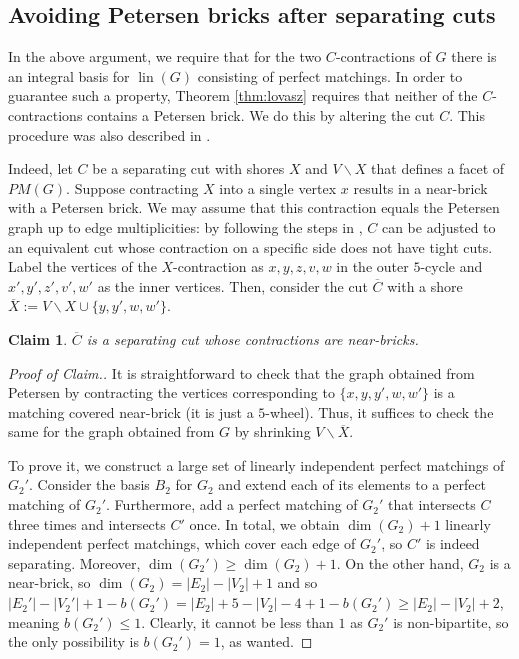 \documentclass[11pt]{article}
\DeclareMathOperator{\lin}{lin}
\newcommand{\1}{\mathbf{1}}
\newcommand{\0}{\mathbf{0}}
\newcounter{claim-nb}[theorem]
\newtheorem{claim}[claim-nb]{Claim}
\newcounter{claim-nbs}[section]
\newenvironment{cproof}
{\begin{proof}
 [Proof of Claim.]
 \vspace{-1.2\parsep}}
{\renewcommand{\qed}{\hfill $\Diamond$} \end{proof}}
\begin{document}
\subsection{Avoiding Petersen bricks after separating cuts}

In the above argument, we require that for the two $C$-contractions of $G$ there is an integral basis for $\lin(G)$ consisting of perfect matchings. In order to guarantee such a property, Theorem \ref{thm:lovasz} requires that neither of the $C$-contractions contains a Petersen brick.
We do this by altering the cut $C$. This procedure was also described in \cite{abdi2025integralbasepm}.

Indeed, let $C$ be a separating cut with shores $X$ and $V\backslash X$ that defines a facet of $PM(G)$. Suppose contracting $X$ into a single vertex $x$ results in a near-brick with a Petersen brick. We may assume that this contraction equals the Petersen graph up to edge multiplicities: by following the steps in , $C$ can be adjusted to an equivalent cut whose contraction on a specific side does not have tight cuts. Label the vertices of the $X$-contraction as $x,y,z,v,w$ in the outer $5$-cycle and $x',y',z',v',w'$ as the inner vertices. Then, consider the cut $\overline{C}$ with a shore $\overline{X}:=V\backslash X\cup \{y,y',w,w'\}$. 
\begin{claim}
    $\overline{C}$ is a separating cut whose contractions are near-bricks.
\end{claim}
\begin{cproof}
    It is straightforward to check that the graph obtained from Petersen by contracting the vertices corresponding to $\{x,y,y',w,w'\}$ is a matching covered near-brick (it is just a $5$-wheel). Thus, it suffices to check the same for the graph obtained from $G$ by shrinking $V\backslash\overline{X}$.

    To prove it, we construct a large set of linearly independent perfect matchings of $G_2'$. Consider the basis $B_2$ for $G_2$ and extend each of its elements to a perfect matching of $G_2'$. Furthermore, add a perfect matching of $G_2'$ that intersects $C$ three times and intersects $C'$ once. In total, we obtain $\dim(G_2)+1$ linearly independent perfect matchings, which cover each edge of $G_2'$, so $C'$ is indeed separating. Moreover, $\dim(G_2')\geq \dim(G_2)+1$. On the other hand, $G_2$ is a near-brick, so $\dim(G_2) = |E_2|-|V_2|+1$ and so $|E_2'|-|V_2'|+1-b(G_2') = |E_2|+5-|V_2|-4+1-b(G_2') \geq |E_2|-|V_2|+2$, meaning $b(G_2')\leq 1$. Clearly, it cannot be less than $1$ as $G_2'$ is non-bipartite, so the only possibility is $b(G_2')=1$, as wanted.
\end{cproof}
\end{document}

